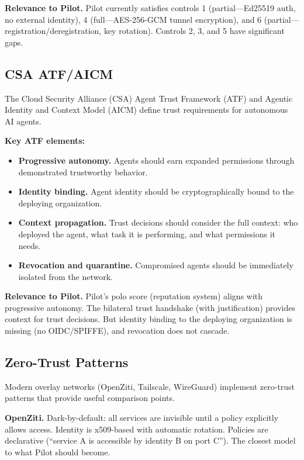 \documentclass[11pt,a4paper]{article}
\begin{document}
\textbf{Relevance to Pilot.} Pilot currently satisfies controls 1 (partial---Ed25519 auth, no external identity), 4 (full---AES-256-GCM tunnel encryption), and 6 (partial---registration/deregistration, key rotation). Controls 2, 3, and 5 have significant gaps.

\subsection{CSA ATF/AICM}

The Cloud Security Alliance (CSA) Agent Trust Framework (ATF) and Agentic Identity and Context Model (AICM) define trust requirements for autonomous AI agents.

\textbf{Key ATF elements:}
\begin{itemize}
    \item \textbf{Progressive autonomy.} Agents should earn expanded permissions through demonstrated trustworthy behavior.
    \item \textbf{Identity binding.} Agent identity should be cryptographically bound to the deploying organization.
    \item \textbf{Context propagation.} Trust decisions should consider the full context: who deployed the agent, what task it is performing, and what permissions it needs.
    \item \textbf{Revocation and quarantine.} Compromised agents should be immediately isolated from the network.
\end{itemize}

\textbf{Relevance to Pilot.} Pilot's polo score (reputation system) aligns with progressive autonomy. The bilateral trust handshake (with justification) provides context for trust decisions. But identity binding to the deploying organization is missing (no OIDC/SPIFFE), and revocation does not cascade.

\subsection{Zero-Trust Patterns}

Modern overlay networks (OpenZiti, Tailscale, WireGuard) implement zero-trust patterns that provide useful comparison points.

\textbf{OpenZiti.} Dark-by-default: all services are invisible until a policy explicitly allows access. Identity is x509-based with automatic rotation. Policies are declarative (``service A is accessible by identity B on port C''). The closest model to what Pilot should become.
\end{document}
